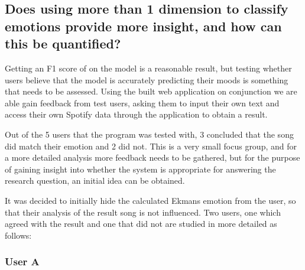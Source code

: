 
\subsection{Does using more than 1 dimension to classify emotions provide more insight, and how can this be quantified?}

Getting an F1 score of  on the model is a reasonable result, but testing whether users believe that the model is accurately predicting their moods is something that needs to be assessed. Using the built web application on conjunction we are able gain feedback from test users, asking them to input their own text and access their own Spotify data through the application to obtain a result.

Out of the 5 users that the program was tested with, 3 concluded that the song did match their emotion and 2 did not. This is a very small focus group, and for a more detailed analysis more feedback needs to be gathered, but for the purpose of gaining insight into whether the system is appropriate for answering the research question, an initial idea can be obtained.

It was decided to initially hide the calculated Ekmans emotion  from the user, so that their analysis of the result song is not influenced. 
Two users, one which agreed with the result and one that did not are studied in more detailed as follows:

\subsubsection{User A}


